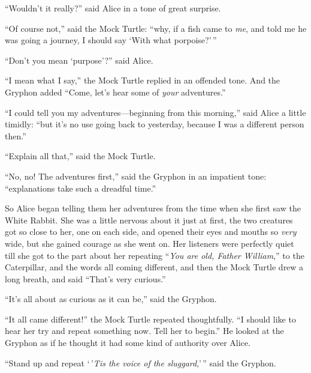 \documentclass[book, 20pt]{extbook}
\begin{document}
``Wouldn't it really?'' said Alice in a tone of great surprise.

``Of course not,'' said the Mock Turtle: ``why, if a fish came to
\emph{me}, and told me he was going a journey, I should say `With what
porpoise?'\,''

``Don't you mean `purpose'?'' said Alice.

``I mean what I say,'' the Mock Turtle replied in an offended tone. And
the Gryphon added ``Come, let's hear some of \emph{your} adventures.''

``I could tell you my adventures---beginning from this morning,'' said
Alice a little timidly: ``but it's no use going back to yesterday,
because I was a different person then.''

``Explain all that,'' said the Mock Turtle.

``No, no! The adventures first,'' said the Gryphon in an impatient tone:
``explanations take such a dreadful time.''

So Alice began telling them her adventures from the time when she first
saw the White Rabbit. She was a little nervous about it just at first,
the two creatures got so close to her, one on each side, and opened
their eyes and mouths so \emph{very} wide, but she gained courage as she
went on. Her listeners were perfectly quiet till she got to the part
about her repeating ``\emph{You are old, Father William},'' to the
Caterpillar, and the words all coming different, and then the Mock
Turtle drew a long breath, and said ``That's very curious.''

``It's all about as curious as it can be,'' said the Gryphon.

``It all came different!'' the Mock Turtle repeated thoughtfully. ``I
should like to hear her try and repeat something now. Tell her to
begin.'' He looked at the Gryphon as if he thought it had some kind of
authority over Alice.

``Stand up and repeat `\,'\emph{Tis the voice of the sluggard},'\,''
said the Gryphon.
\end{document}
